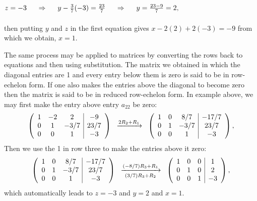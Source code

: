 \documentclass{ximera}
\begin{document}
\begin{example}
\begin{explanation}
\hspace{.5cm} $z = -3   \hspace{.5cm}\Rightarrow \hspace{.5cm} y- \frac{3}{7}(-3) = \frac{23}{7} \hspace{.5cm}\Rightarrow \hspace{.5cm} y= \frac{23-9}{7}= 2,$
\\ \\ \hspace{.5cm} then putting $y$ and $z$ in the first equation gives $x -2(2)+2(-3)=-9$ from which we obtain, $x= 1$.

The same process may be applied to matrices by converting the rows back to equations and then using substitution. The matrix we obtained in which the diagonal entries are 1 and every entry below them is zero is said to be in row-echelon form. If one also makes the entries above the diagonal to become zero then the matrix is said to be in reduced row-echelon form. In example above, we may first make the entry above entry $a_{22}$ be zero:
\[
\left(\begin{array}{ccc|c}
  1 &  -2 & 2 &-9 \\
  0 & 1 & -3/7 & 23/7 \\
  0 &  0 & 1 & -3
\end{array}\right)
\hspace{.2cm}\xrightarrow{2R_{2}+R_{1}} \hspace{.2cm}
\left(\begin{array}{ccc|c}
  1 &  0 & 8/7 &-17/7 \\
  0 & 1 & -3/7 & 23/7 \\
  0 &  0 & 1 & -3
\end{array}\right),
\]
Then we use the 1 in row three to make the entries above it zero:
\[
\left(\begin{array}{ccc|c}
  1 &  0 & 8/7 &-17/7 \\
  0 & 1 & -3/7 & 23/7 \\
  0 &  0 & 1 & -3
\end{array}\right)
\hspace{.2cm}\xrightarrow[(3/7)R_{3}+R_{2}]{(-8/7)R_{3}+R_{1}} \hspace{.2cm}
\left(\begin{array}{ccc|c}
  1 &  0 & 0 &1 \\
  0 & 1 & 0& 2 \\
  0 &  0 & 1 & -3
\end{array}\right),
\]
which automatically leads to $z=-3$ and $y=2$ and $x=1$.
\end{explanation}
\end{example}
\end{document}

